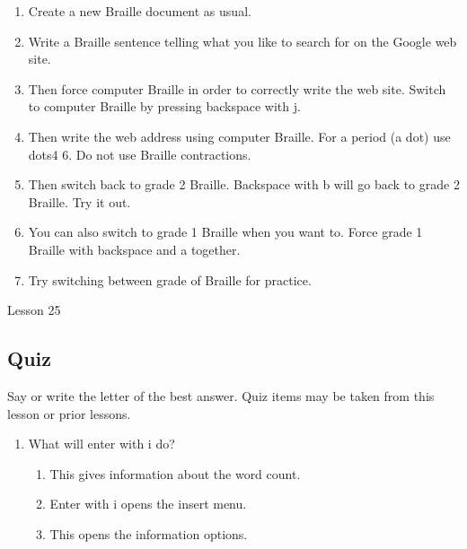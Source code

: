 \documentclass[10pt,letterpaper,twoside]{report}
\begin{document}
{{{{\begin{enumerate}
	\item Create a new Braille document as usual.
	      
	\item Write a Braille sentence telling what you like to search for on the Google web site.
	      
	\item Then force computer Braille in order to correctly write the web site.  Switch to computer Braille by pressing backspace with j.
	      
	\item Then write the web address using computer Braille.  For a period (a dot) use dots4 6.  Do not use Braille contractions.
	      
	\item Then switch back to grade 2 Braille.  Backspace with b will go back to grade 2 Braille.  Try it out.
	      
	\item You can also switch to grade 1 Braille when you want to.  Force grade 1 Braille with backspace and a together.
	      
	\item Try switching between grade of Braille for practice.
\end{enumerate}





\clearpage

\newpage
Lesson 25

\subsection{Quiz}



Say or write the letter of the best answer.  Quiz items may be taken from this lesson or prior lessons.



\begin{enumerate}
	\item What will enter with i do?
	      \begin{enumerate}
		      \item This gives information about the word count.
		            
		      \item Enter with i opens the insert menu.
		            
		      \item This opens the information options.
		            

\end{enumerate}
\end{enumerate}}}}}
\end{document}
